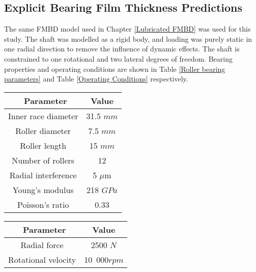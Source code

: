 \subsection{Explicit Bearing Film Thickness Predictions}

The same FMBD model used in Chapter \ref{Lubricated FMBD} was used for this study. The shaft was modelled as a rigid body, and loading was purely static in one radial direction to remove the influence of dynamic effects. The shaft is constrained to one rotational and two lateral degrees of freedom. Bearing properties and operating conditions are shown in Table \ref{Roller bearing parameters} and Table \ref{Operating Conditions} respectively.

\begin{table*}
	\caption{Roller Bearing Parameters}
	\label{Roller bearing parameters}
	\centering
	\renewcommand{\arraystretch}{1.5}%
	\begin{tabular}{|c|c|}
		\hline
		\ \textbf{Parameter} & \textbf{Value} \\ [0.5ex]
		\hline
		Inner race diameter & 31.5 $mm$ \\ [0.5ex]
		\hline
		Roller diameter & 7.5 $mm$ \\ [0.5ex]
		\hline
		Roller length & 15 $mm$ \\ [0.5ex]
		\hline
		Number of rollers & 12 \\ [0.5ex]
		\hline
		Radial interference & 5 $\mu \mathrm{m}$ \\ [0.5ex]
		\hline
		Young's modulus & 218 $GPa$ \\ [0.5ex]
		\hline
		Poisson's ratio & 0.33 \\ [0.5ex]
		\hline
	\end{tabular}
\end{table*}

\begin{table*}
	\caption{Operating Conditions}
	\label{Operating Conditions}
	\centering
	\renewcommand{\arraystretch}{1.5}%
	\begin{tabular}{|c|c|}
		\hline
		\ \textbf{Parameter} & \textbf{Value} \\ [0.5ex]
		\hline
		Radial force & 2500 $N$ \\ [0.5ex]
		\hline
		Rotational velocity & 10~000$rpm$ \\ [0.5ex]
		\hline
	\end{tabular}
\end{table*}

